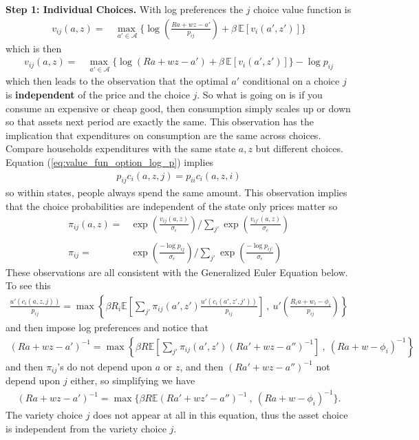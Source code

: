 \documentclass[12pt,pdftex]{article}
\begin{document}
\begin{onehalfspacing}
\textbf{Step 1: Individual Choices.} With log preferences the $j$ choice value function is
\begin{align}
v_{ij}(a, z) = &  \max_{\ a' \in \mathcal{A} }\bigg  \{ \log\left (\frac{Ra + wz - a'}{p_{ij}} \right )  + \beta \, \mathbb{E} [v_{i}(a', z')]  \bigg\}
\end{align}
which is then
\begin{align}
v_{ij}(a, z) = &  \max_{\ a' \in \mathcal{A} }\bigg  \{ \log(Ra + wz - a' )  + \beta \, \mathbb{E} [v_{i}(a', z' )]  \bigg\} - \log p_{ij}
\label{eq:value_fun_option_log_p}
\end{align}
which then leads to the observation that the optimal $a'$ conditional on a choice $j$ is \textbf{independent} of the price and the choice $j$. So what is going on is if you consume an expensive or cheap good, then consumption simply scales up or down so that assets next period are exactly the same. This observation has the implication that expenditures on consumption are the same across choices. Compare households expenditures with the same state $a,z$ but different choices. Equation (\ref{eq:value_fun_option_log_p}) implies
\begin{align}
p_{ij}c_{i}(a,z,j) = p_{ii}c_{i}(a,z,i)
\label{eq:apx-same-spending}
\end{align}
so within states, people always spend the same amount. This observation implies that the choice probabilities are independent of the state only prices matter so
\begin{align}
\pi_{ij}(a, z) = & \exp \left( \frac{ v_{ij}(a, z) }{\sigma_{\epsilon}} \right) \Bigg / \sum_{j'} \exp \left( \frac{ v_{ij'}(a, z ) }{\sigma_{\epsilon}} \right) \\
\nonumber\\
\pi_{ij} = & \exp \left( \frac{  -\log p_{ij} }{\sigma_{\epsilon}} \right) \Bigg / \sum_{j'} \exp \left( \frac{ -\log p_{ij'} }{\sigma_{\epsilon}} \right) \label{apx-eq:shares}
\end{align}
These observations are all consistent with the Generalized Euler Equation below. To see this
\begin{align}
\frac{u'(c_{i}(a, z, j))}{p_{ij}} = \max \left\{ \beta R_{i} \mathbb{E} \left[ \sum_{j'} \pi_{ij}(a', z') \frac{u'(c_{i}(a', z', j'))}{p_{ij}} \right] \ , \  u' \left( \frac{R_i a + w_i - \phi_{i}}{p_{ij}} \right) \right \}
\end{align}
and then impose log preferences and notice that
\begin{align}
(Ra + wz - a')^{-1} = \max \left\{ \beta R \mathbb{E} \left[ \sum_{j'} \pi_{ij}(a', z') (Ra' + wz - a'')^{-1} \right] \ , \   (R a + w - \phi_{i})^{-1} \right \}
\end{align}
and then $\pi_{ij}$'s do not depend upon $a$ or $z$, and then $(Ra' + wz - a'')^{-1}$ not depend upon $j$ either, so simplifying we have
\begin{align}
(Ra + wz - a')^{-1} = \max \bigg \{ \beta R \mathbb{E} (Ra' + wz' - a'')^{-1}  \ , \   (R a + w - \phi_{i})^{-1}  \bigg \}.
\end{align}
The variety choice $j$ does not appear at all in this equation, thus the asset choice is independent from the variety choice $j$.


\end{onehalfspacing}
\end{document}
